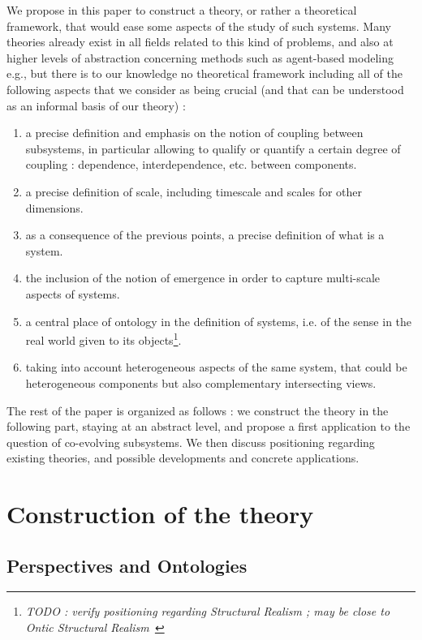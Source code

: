 We propose in this paper to construct a theory, or rather a theoretical framework, that would ease some aspects of the study of such systems. Many theories already exist in all fields related to this kind of problems, and also at higher levels of abstraction concerning methods such as agent-based modeling e.g., but there is to our knowledge no theoretical framework including all of the following aspects that we consider as being crucial (and that can be understood as an informal basis of our theory) :
\begin{enumerate}
\item a precise definition and emphasis on the notion of coupling between subsystems, in particular allowing to qualify or quantify a certain degree of coupling : dependence, interdependence, etc. between components.
\item a precise definition of scale, including timescale and scales for other dimensions.
\item as a consequence of the previous points, a precise definition of what is a system.
\item the inclusion of the notion of emergence in order to capture multi-scale aspects of systems.
\item a central place of ontology in the definition of systems, i.e. of the sense in the real world given to its objects\footnote{\textit{TODO : verify positioning regarding Structural Realism ; may be close to Ontic Structural Realism~\cite{frigg2011everything}}
}.
\item taking into account heterogeneous aspects of the same system, that could be heterogeneous components but also complementary intersecting views.
\end{enumerate}


The rest of the paper is organized as follows : we construct the theory in the following part, staying at an abstract level, and propose a first application to the question of co-evolving subsystems. We then discuss positioning regarding existing theories, and possible developments and concrete applications.


\section*{Construction of the theory}

\subsection*{Perspectives and Ontologies}

